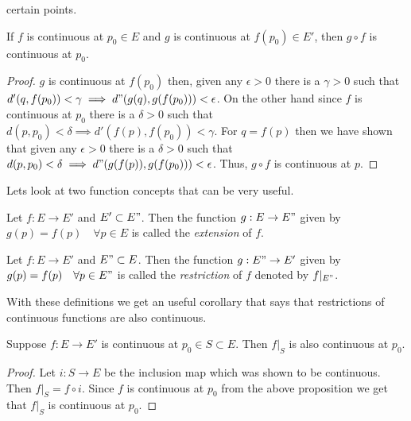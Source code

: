 certain points. 
\begin{Proposition}
    If $f$ is continuous at $p_0 \in E$ and $g$ is continuous at $f(p_0) \in E'$, then $g \circ f$
    is continuous at $p_0$.
\end{Proposition}
\begin{proof}
    $g$ is continuous at $f(p_0)$ then, given any $\epsilon > 0$ there is a $\gamma > 0$ such that
    $d'(q,f(p_0)) < \gamma \implies d"(g(q),g(f(p_0))) < \epsilon$. On the other hand since $f$ is
    continuous at $p_0$ there is a $\delta > 0$ such that $d(p,p_0) < \delta \implies
    d'(f(p),f(p_0)) < \gamma$. For $q = f(p)$ then we have shown that given any $\epsilon > 0$ there
    is a $\delta > 0$ such that $d(p,p_0) < \delta \implies d"(g(f(p)),g(f(p_0))) < \epsilon$. Thus,
    $g \circ f$ is continuous at $p$.
\end{proof}
Lets look at two function concepts that can be very useful. 
\begin{Definition}
    Let $f : E \to E'$ and $E' \subset E"$. Then the function $g : E \to E"$ given by $g(p) = f(p)
    \quad \forall p \in E$ is called the \emph{extension} of $f$.
\end{Definition}

\begin{Definition}
    Let $f : E \to E'$ and $E" \subset E$. Then the function $g : E" \to E'$ given by $g(p) = f(p)
    \quad \forall p \in E"$ is called the \emph{restriction} of $f$ denoted by $f|_{E"}$.
\end{Definition}
With these definitions we get an useful corollary that says that restrictions of continuous
functions are also continuous.
\begin{Corollary}
    Suppose $f : E \to E'$ is continuous at $p_0 \in S \subset E$. Then $f|_{S}$ is also continuous
    at $p_0$.
\end{Corollary}
\begin{proof}
    Let $i : S \to E$ be the inclusion map which was shown to be continuous. Then $f|_{S} = f \circ
    i$. Since $f$ is continuous at $p_0$ from the above proposition we get that $f|_{S}$ is
    continuous at $p_0$.
\end{proof}

